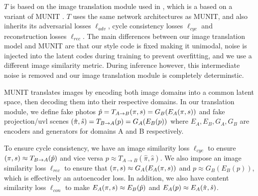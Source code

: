 \documentclass{article}
\begin{document}
	$T$ is based on the image translation module used in \citep{surgical_video_translation}, which is a based on a variant \cite{surgical_image_translation} of MUNIT \cite{munit}. 
	$T$ uses the same network architectures as MUNIT, and also inherits its adversarial losses $\ell_{adv}$, cycle consistency losses $\ell_{cyc}$ and reconstruction losses $\ell_{rec}$.
	The main differences between our image translation model and MUNIT are that our style code is fixed making it unimodal, noise is injected into the latent codes during training to prevent overfitting, and we use a different image similarity metric. 
	During inference however, this intermediate noise is removed and our image translation module is completely determinstic. 

	MUNIT translates images by encoding both image domains into a common latent space, then decoding them into their respective domains.
	In our translation module, we define fake photos $\hat{p} = T_{A\rightarrow B}(\pi,s) = G_B(E_A(\pi,s))$ and fake projection/uvl scenes $(\hat{\pi},\hat{s}) = T_{B\rightarrow A}(p) = G_A(E_B(p))$
		where $E_A, E_B, G_A, G_B$ are encoders and generators for domains A and B respectively.


	To ensure cycle consistency, we have an image similarity loss $\ell_{cyc}$ to ensure
	$(\pi,s) \approx T_{B\rightarrow A}(\hat{p})$
	and vice versa
	$p \approx T_{A\rightarrow B}(\hat{\pi},\hat{s})$.
	We also impose an image similarity loss $\ell_{rec}$ to ensure that $(\pi,s) \approx G_A(E_A(\pi,s))$ and $p \approx G_B(E_B(p))$, which is effectively an autoencoder loss. 
	In addition, we also have content similarity loss $ \ell_{con}$ to make 
	$E_A(\pi,s) \approx E_B(\hat{p})$ and $E_A(p) \approx E_A(\hat{\pi},\hat{s})$.
\end{document}
